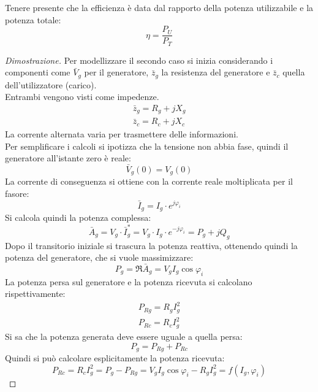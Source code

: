 \documentclass[../main.tex]{subfiles}
\begin{document}
	Tenere presente che la efficienza è data dal rapporto della potenza utilizzabile e la potenza totale:
	\begin{equation}
		\eta = \frac{P_U}{P_T}	
	\end{equation}
	\begin{proof}[Dimostrazione]
		Per modellizzare il secondo caso si inizia considerando i componenti come $\bar V_g$ per il generatore, $\bar z_g$ la resistenza del generatore e $\bar z_c$ quella dell'utilizzatore (carico). \\
		Entrambi vengono visti come impedenze.
		\begin{gather}
			\bar z_g = R_g	+ jX_g \\ 
			\bar z_c = R_c+jX_c
		\end{gather}
		La corrente alternata varia per trasmettere delle informazioni.\\
		Per semplificare i calcoli si ipotizza che la tensione non abbia fase, quindi il generatore all'istante zero è reale:
		\begin{equation}
			\bar V_g(0) = V_g(0)
		\end{equation}
		La corrente di conseguenza si ottiene con la corrente reale moltiplicata per il fasore:
		\begin{equation}
			\bar I_g = I_g \cdot e^{j\varphi_i}	
		\end{equation}
		Si calcola quindi la potenza complessa:
		\begin{equation}
			\bar A_g = V_g \cdot \bar I_g^\ast = V_g \cdot I_g \cdot e^{-j\varphi_i} = P_g+jQ_g	
		\end{equation}
		Dopo il transitorio iniziale si trascura la potenza reattiva, ottenendo quindi la potenza del generatore, che si vuole massimizzare:
		\begin{equation}
			P_g = \Re{\bar A_g} = V_gI_g \cos \varphi_i	
		\end{equation}
		La potenza persa sul generatore e la potenza ricevuta si calcolano rispettivamente:
		\begin{gather}
			P_{Rg} = R_g I_g^2 \\
			P_{Rc} = R_c I_g^2
		\end{gather}
		Si sa che la potenza generata deve essere uguale a quella persa:
		\begin{equation}
			P_g = P_{Rg}+P_{Rc}	
		\end{equation}
		Quindi si può calcolare esplicitamente la potenza ricevuta:
		\begin{equation} \label{reatt}
			P_{Rc}=R_cI_g^2 = P_g - P_{Rg} = V_gI_g \cos \varphi_i - R_gI_g^2 = f(I_g, \varphi_i)	

\end{equation}
\end{proof}
\end{document}
